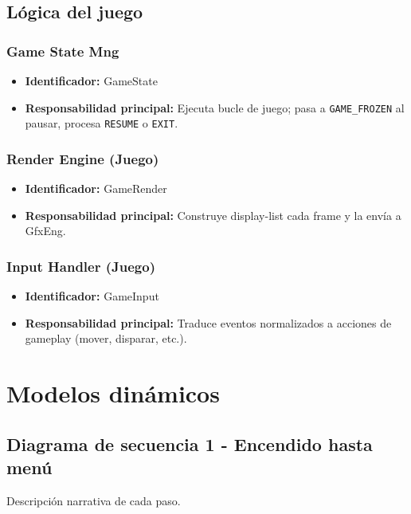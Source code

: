 \documentclass[11pt,a4paper]{article}
\begin{document}
\subsection{Lógica del juego}

\subsubsection{Game State Mng}
\begin{itemize}
  \item \textbf{Identificador:} GameState
  \item \textbf{Responsabilidad principal:} Ejecuta bucle de juego; pasa a \texttt{GAME\_FROZEN} al pausar, procesa \texttt{RESUME} o \texttt{EXIT}.
\end{itemize}

\subsubsection{Render Engine (Juego)}
\begin{itemize}
  \item \textbf{Identificador:} GameRender
  \item \textbf{Responsabilidad principal:} Construye display-list cada frame y la envía a GfxEng.
\end{itemize}

\subsubsection{Input Handler (Juego)}
\begin{itemize}
  \item \textbf{Identificador:} GameInput
  \item \textbf{Responsabilidad principal:} Traduce eventos normalizados a acciones de gameplay (mover, disparar, etc.).
\end{itemize}

\section{Modelos dinámicos}
\subsection{Diagrama de secuencia 1 - Encendido hasta menú}
Descripción narrativa de cada paso.
\end{document}
